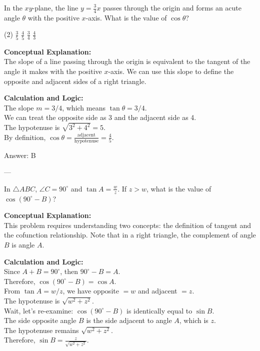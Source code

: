 \documentclass[11pt,paper=a4,answers]{exam}
\begin{document}
\begin{questions}
\question
In the $xy$-plane, the line $y = \frac{3}{4}x$ passes through the origin and forms an acute angle $\theta$ with the positive $x$-axis. What is the value of $\cos \theta$?
\begin{tasks}(2)
    \task $\frac{3}{5}$
    \task $\frac{4}{5}$
    \task $\frac{3}{4}$
    \task $\frac{4}{3}$
\end{tasks}

\begin{solution}
\textbf{Conceptual Explanation:} \\
The slope of a line passing through the origin is equivalent to the tangent of the angle it makes with the positive $x$-axis. We can use this slope to define the opposite and adjacent sides of a right triangle.

\vspace{10pt}
\textbf{Calculation and Logic:} \\
The slope $m = 3/4$, which means $\tan \theta = 3/4$. \\
We can treat the opposite side as 3 and the adjacent side as 4. \\
The hypotenuse is $\sqrt{3^2 + 4^2} = 5$. \\
By definition, $\cos \theta = \frac{\text{adjacent}}{\text{hypotenuse}} = \frac{4}{5}$.

\vspace{15pt}
Answer: \colorbox{yellow!100}{B}
\end{solution}

---

\question
In $\triangle ABC$, $\angle C = 90^\circ$ and $\tan A = \frac{w}{z}$. If $z > w$, what is the value of $\cos(90^\circ - B)$?

\begin{solution}
\textbf{Conceptual Explanation:} \\
This problem requires understanding two concepts: the definition of tangent and the cofunction relationship. Note that in a right triangle, the complement of angle $B$ is angle $A$.

\vspace{10pt}
\textbf{Calculation and Logic:} \\
Since $A + B = 90^\circ$, then $90^\circ - B = A$. \\
Therefore, $\cos(90^\circ - B) = \cos A$. \\
From $\tan A = w/z$, we have opposite $= w$ and adjacent $= z$. \\
The hypotenuse is $\sqrt{w^2 + z^2}$. \\
Wait, let's re-examine: $\cos(90^\circ - B)$ is identically equal to $\sin B$. \\
The side opposite angle $B$ is the side adjacent to angle $A$, which is $z$. \\
The hypotenuse remains $\sqrt{w^2 + z^2}$. \\
Therefore, $\sin B = \frac{z}{\sqrt{w^2 + z^2}}$.


\end{solution}
\end{questions}
\end{document}
